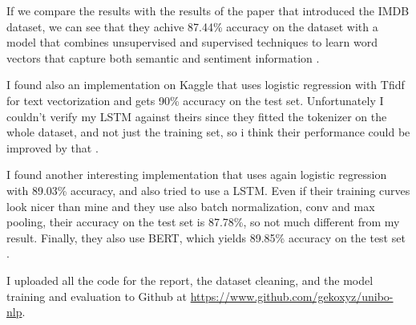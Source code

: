 \documentclass{article}
\begin{document}
If we compare the results with the results of the paper that introduced the IMDB dataset, we can see that they achive 87.44\% accuracy on the dataset with a model that combines unsupervised and supervised techniques to learn word vectors that capture both semantic and sentiment information \cite{imdb_dataset_stanfordnlp}.

I found also an implementation on Kaggle that uses logistic regression with Tfidf for text vectorization and gets 90\% accuracy on the test set. Unfortunately I couldn't verify my LSTM against theirs since they fitted the tokenizer on the whole dataset, and not just the training set, so i think their performance could be improved by that \cite{kaggleIMDbSentiment}.

I found another interesting implementation that uses again logistic regression with 89.03\% accuracy, and also tried to use a LSTM.
Even if their training curves look nicer than mine and they use also batch normalization, conv and max pooling, their accuracy on the test set is 87.78\%, so not much different from my result.
Finally, they also use BERT, which yields 89.85\% accuracy on the test set \cite{kaggleIMDBSentimentLSTMandBERT}.

I uploaded all the code for the report, the dataset cleaning, and the model training and evaluation to Github at \url{https://www.github.com/gekoxyz/unibo-nlp}.



\end{document}
